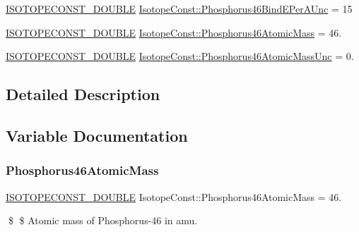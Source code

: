 \begin{DoxyCompactItemize}
\mbox{\hyperlink{group___isotope_const-_macros_ga8f45a7272ce02c0b4c65c44636ed719a}{I\+S\+O\+T\+O\+P\+E\+C\+O\+N\+S\+T\+\_\+\+D\+O\+U\+B\+LE}} \mbox{\hyperlink{group___isotope_const-_phosphorus-_p46_ga9e52e65d41b3114adb88869ff5f3247a}{Isotope\+Const\+::\+Phosphorus46\+Bind\+E\+Per\+A\+Unc}} = 15
\item 
\mbox{\hyperlink{group___isotope_const-_macros_ga8f45a7272ce02c0b4c65c44636ed719a}{I\+S\+O\+T\+O\+P\+E\+C\+O\+N\+S\+T\+\_\+\+D\+O\+U\+B\+LE}} \mbox{\hyperlink{group___isotope_const-_phosphorus-_p46_gac7e25b7293764f4ed0fad1f11090344e}{Isotope\+Const\+::\+Phosphorus46\+Atomic\+Mass}} = 46.
\item 
\mbox{\hyperlink{group___isotope_const-_macros_ga8f45a7272ce02c0b4c65c44636ed719a}{I\+S\+O\+T\+O\+P\+E\+C\+O\+N\+S\+T\+\_\+\+D\+O\+U\+B\+LE}} \mbox{\hyperlink{group___isotope_const-_phosphorus-_p46_gac3bb35a40cb595b511929d0b1aa0146a}{Isotope\+Const\+::\+Phosphorus46\+Atomic\+Mass\+Unc}} = 0.
\end{DoxyCompactItemize}


\subsection{Detailed Description}


\subsection{Variable Documentation}
\mbox{\label{group___isotope_const-_phosphorus-_p46_gac7e25b7293764f4ed0fad1f11090344e}} 
\subsubsection{\texorpdfstring{Phosphorus46\+Atomic\+Mass}{Phosphorus46AtomicMass}}
{\footnotesize\ttfamily \mbox{\hyperlink{group___isotope_const-_macros_ga8f45a7272ce02c0b4c65c44636ed719a}{I\+S\+O\+T\+O\+P\+E\+C\+O\+N\+S\+T\+\_\+\+D\+O\+U\+B\+LE}} Isotope\+Const\+::\+Phosphorus46\+Atomic\+Mass = 46.}

\$ \$ Atomic mass of Phosphorus-\/46 in amu. \mbox{\label{group___isotope_const-_phosphorus-_p46_gac3bb35a40cb595b511929d0b1aa0146a}} 
